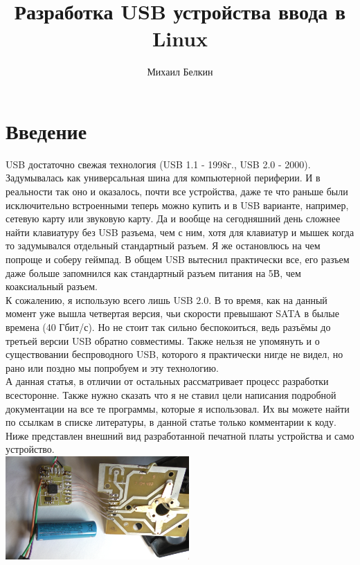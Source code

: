 \documentclass[12pt,a4paper]{article}
\begin{document}
\begin{titlepage}
\title{Разработка USB устройства ввода в Linux}
\author{Михаил Белкин}
\maketitle
\end{titlepage}

\tableofcontents
\newpage

\section{Введение}
    USB достаточно свежая технология (USB 1.1 - 1998г., USB 2.0 - 2000).
    Задумывалась как универсальная шина для компьютерной периферии.
    И в реальности так оно и оказалось, почти все устройства, даже те что
    раньше были исключительно встроенными теперь можно купить и в USB варианте,
    например, сетевую карту или звуковую карту. Да и вообще на сегодняшний
    день сложнее найти клавиатуру без USB разъема, чем с ним, хотя для
    клавиатур и мышек когда то задумывался отдельный стандартный разъем.
    Я же остановлюсь на чем попроще и соберу геймпад. В общем USB вытеснил
    практически все, его разъем даже больше запомнился как
    стандартный разъем питания на 5В, чем коаксиальный разъем.\\
    К сожалению, я использую всего лишь USB 2.0. В то время, как на данный момент
    уже вышла четвертая версия, чьи скорости превышают SATA в былые времена
    (40 Гбит/с). Но не стоит так сильно беспокоиться, ведь разъёмы до третьей
    версии USB обратно совместимы. Также нельзя не упомянуть и о существовании
    беспроводного USB, которого я практически нигде не видел, но рано или поздно
    мы попробуем и эту технологию.\\
    А данная статья, в отличии от остальных рассматривает процесс разработки
    всесторонне. Также нужно сказать что я не ставил цели написания
    подробной документации на все те программы, которые я использовал. Их вы
    можете найти по ссылкам в списке литературы, в данной статье только
    комментарии к коду. Ниже представлен внешний вид разработанной печатной
    платы устройства и само устройство.\\
\includegraphics[width=7cm]{pcb.jpg}
\end{document}
